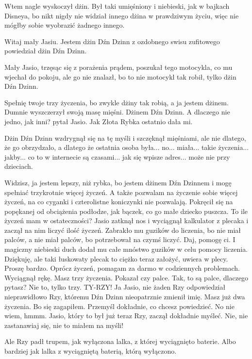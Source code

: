Wtem nagle wyskoczył dżin. Był taki umięśniony i niebieski, jak w bajkach Disneya, bo nikt nigdy nie widział innego dżina w prawdziwym życiu, więc nie mógłby sobie wyobrazić żadnego innego.
\begin{dialogue}
	\ds{} Witaj mały Jasiu. Jestem dżin Dźn Dzinn z ozdobnego swisu zufitowego \dm{} powiedział dżin Dźn Dzinn.
\end{dialogue}
	Mały Jasio, trzęsąc się z porażenia prądem, poszukał tego motocykla, co mu wjechał do pokoju, ale go nie znalazł, bo to nie motocykl tak robił, tylko dżin Dźn Dzinn.
\begin{dialogue}
	\ds{} Spełnię twoje trzy życzenia, bo zwykle dżiny tak robią, a ja jestem dżinem. \dm{} Dumnie wyszczerzył swoją masę mięśni. \dm{} Dżinem Dźn Dzinn.
	\ds{} A dlaczego nie jedno, jak inni? \dm{} pytał Jasio. \dm{} Jak Złota Rybka ostatnio dała mi.
\end{dialogue}
Dżin Dźn Dzinn wzdrygnął się na tę myśli i szczęknął mięśniami, ale nie dlatego, że go obrzydzało, a dlatego że ostatnia osoba była... no... miała... takie życzenia... jakby... co to w internecie są czasami... jak się wpisze adres... może nie przy dzieciach.
\begin{dialogue}
	\ds{} Widzisz, ja jestem lepszy, niż rybka, bo jestem dżinem Dźn Dzinnem i mogę spełniać trzykrotnie więcej życzeń.
	A także pozwalam na życzenie sobie więcej życzeń, na co cyganki i czterolistne koniczynki nie pozwalają. \dm{} Pokręcił się na popękanej od obciążenia podłodze,
	jak bączek, co go małe dziecko puszcza.
	\ds{} To ile życzeń mam w ostateczności? \dm{} Jasio zatknął nos i wyciągnął kalkulator z plecaka i zaczął na nim liczyć ilość życzeń. Zabrakło mu guzików do liczenia, bo nie miał palców, a nie miał palców, bo potrzebował na czymś liczyć.
	\ds{} Daj, pomogę ci. \dm{} I magiczny niebieski duch dodał mu całe mnóstwo guzików w celu pomocy liczenia.
	\ds{} Dziękuję, ale taki łuskowaty plecak to ciężko teraz założyć, uwiera w plecy.
	\ds{} Proszę bardzo. Oprócz życzeń, pomagam za darmo w codziennych problemach. \dm{} Wyciągnął rękę. \dm{} Masz trzy życzenia. \dm{} Pokazał czy palce.
	\ds{} Tak, to są palce, dlaczego pytasz?
	\ds{} Nie to, tylko trzy. TY-RZY!
	\ds{} Ja Jasio, nie żaden Rzy \dm{} odpowiedział nieprawidłowo Rzy, któremu Dźn Dzinn nieopatrznie zmienił imię.
	\ds{} Masz już dwa życzenia. Bo się zagapiłem. Przemyśl dokładnie, co chcesz powiedzieć.
	\ds{} No nie wiem, hmmm. \dm{} Jasio, który to był już teraz Rzy, zaczął dokładnie myśleć.
	\dm{} Nie, nie zastanawiaj się, nie to miałem na myśli!
\end{dialogue}
Ale Rzy padł trupem, jak wyłączona lalka, z której wyciągnięto baterie. 
Albo bardziej jak lalka z wyciągniętą baterią, którą wyłączono.


